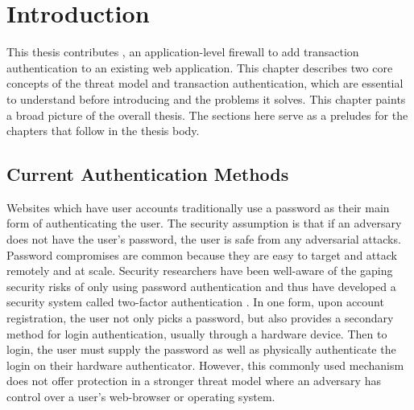 \chapter{Introduction}

This thesis contributes \sys{}, an application-level firewall to add transaction authentication to an existing web application. This chapter describes two core concepts of the threat model and transaction authentication, which are essential to understand before introducing \sys{} and the problems it solves. This chapter paints a broad picture of the overall thesis. The sections here serve as a preludes for the chapters that follow in the thesis body.





\section{Current Authentication Methods}

Websites which have user accounts traditionally use a password as their main form of authenticating the user. The security assumption is that if an adversary does not have the user's password, the user is safe from any adversarial attacks. Password compromises are common \cite{questRemovePasswords} because they are easy to target and attack remotely and at scale. Security researchers have been well-aware of the gaping security risks of only using password authentication and thus have developed a security system called two-factor authentication \cite{2FA}. In one form, upon account registration, the user not only picks a password, but also provides a secondary method for login authentication, usually through a hardware device. Then to login, the user must supply the password as well as physically authenticate the login on their hardware authenticator. However, this commonly used mechanism does not offer protection in a stronger threat model where an adversary has control over a user's web-browser or operating system. 

